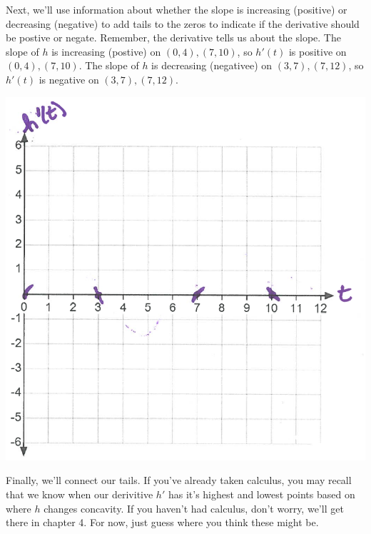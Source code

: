 \documentclass[nooutcomes,handout]{ximera}
\begin{document}
\begin{problem}
\begin{enumerate}
\begin{freeResponse}
\begin{image}
			\end{image}
			Next, we'll use information about whether the slope is increasing (positive) or decreasing (negative) to add tails to the zeros to indicate if the derivative should be postive or negate.  Remember, the derivative tells us about the slope. The slope of $h$ is increasing (postive) on $(0,4),(7,10)$, so $h'(t)$ is positive on $(0,4),(7,10)$.  The slope of $h$ is decreasing (negativee) on $(3,7),(7,12)$, so $h'(t)$ is negative on $(3,7),(7,12)$.
			\begin{image}
			\includegraphics[scale=.4]{Figure11.png}
			\end{image}
			Finally, we'll connect our tails.  If you've already taken calculus, you may recall that we know when our derivitive $h'$ has it's highest and lowest points based on where $h$ changes concavity.  If you haven't had calculus, don't worry, we'll get there in chapter 4.  For now, just guess where you think these might be.
			\begin{image}

\end{image}
\end{freeResponse}
\end{enumerate}
\end{problem}
\end{document}
